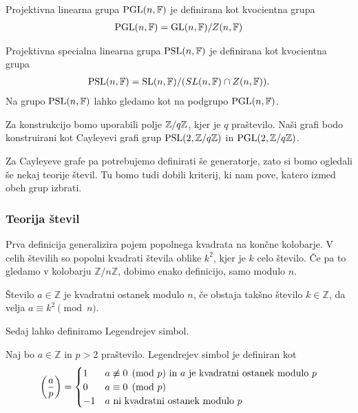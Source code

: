 \begin{definicija}
    Projektivna linearna grupa \(\operatorname{PGL}(n, \mathbb F)\) je definirana kot kvocientna grupa 
    \begin{align*}
        \operatorname{PGL}(n, \mathbb F) = \operatorname{GL}(n, \mathbb F)/Z(n, \mathbb F)
    \end{align*}

    Projektivna specialna linearna grupa \(\operatorname{PSL}(n, \mathbb F)\) je definirana kot kvocientna grupa 
    \begin{align*}
        \operatorname{PSL}(n, \mathbb F) = \operatorname{SL}(n, \mathbb F)/(SL(n, \mathbb F)\cap Z(n, \mathbb F)).
    \end{align*}
    Na grupo \(\operatorname{PSL}(n, \mathbb F)\) lahko gledamo kot na podgrupo \(\operatorname{PGL}(n, \mathbb F)\).
\end{definicija}

Za konstrukcijo bomo uporabili polje \(\mathbb Z/q\mathbb Z\), kjer je \(q\) praštevilo. Naši grafi bodo konstruirani kot Cayleyevi grafi grup \(\operatorname{PSL}(2, \mathbb Z/q\mathbb Z)\) in \(\operatorname{PGL}(2, \mathbb Z/q\mathbb Z)\).

Za Cayleyeve grafe pa potrebujemo definirati še generatorje, zato si bomo ogledali še nekaj teorije števil. Tu bomo tudi dobili kriterij, ki nam pove, katero izmed obeh grup izbrati.

\subsubsection{Teorija števil}
Prva definicija generalizira pojem popolnega kvadrata na končne kolobarje. V celih številih so popolni kvadrati števila oblike \(k^2\), kjer je \(k\) celo število. Če pa to gledamo v kolobarju \(\mathbb Z/n\mathbb Z\), dobimo enako definicijo, samo modulo \(n\).
\begin{definicija}
    Število \(a\in \mathbb Z\) je kvadratni ostanek modulo \(n\), če obstaja takšno število \(k\in \mathbb Z\), da velja \(a\equiv k^2 \pmod n\).
\end{definicija}

Sedaj lahko definiramo Legendrejev simbol.
\begin{definicija}
    Naj bo \(a\in \mathbb Z\) in \(p>2\) praštevilo. Legendrejev simbol je definiran kot
    \begin{align*}
        \left(\frac{a}{p}\right) =
        \begin{cases}
            1  & a \not\equiv 0\pmod p \text{ in } a \text{ je kvadratni ostanek modulo } p \\
            0  & a \equiv 0 \pmod p                                            \\
            -1 & a \text{ ni kvadratni ostanek modulo } p
        \end{cases}
    \end{align*}
\end{definicija}

